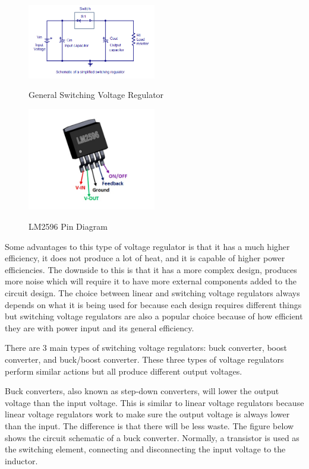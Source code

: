 \begin{figure}[H]
    \caption{General Switching Voltage Regulator}
    \centering
    \includegraphics[width=0.5\textwidth]{images/Gen_Switching_Voltage_Regulator.png}
    \label{fig:general-switching-voltage-regulator}
\end{figure}
\begin{figure}[H]
    \caption{LM2596 Pin Diagram}
    \centering
    \includegraphics[width=0.5\textwidth]{images/LM2596_pin_diagram.png}
    \label{fig:lm2596-pin-diagram}
\end{figure}
Some advantages to this type of voltage regulator is that it has a much higher efficiency, it does not produce a lot of heat, and it is capable of higher power efficiencies. The downside to this is that it has a more complex design, produces more noise which will require it to have more external components added to the circuit design. The choice between linear and switching voltage regulators always depends on what it is being used for because each design requires different things but switching voltage regulators are also a popular choice because of how efficient they are with power input and its general efficiency.\par
There are 3 main types of switching voltage regulators: buck converter, boost converter, and buck/boost converter. These three types of voltage regulators perform similar actions but all produce different output voltages.\par
Buck converters, also known as step-down converters, will lower the output voltage than the input voltage. This is similar to linear voltage regulators because linear voltage regulators work to make sure the output voltage is always lower than the input. The difference is that there will be less waste. The figure below shows the circuit schematic of a buck converter. Normally, a transistor is used as the switching element, connecting and disconnecting the input voltage to the inductor. \par
